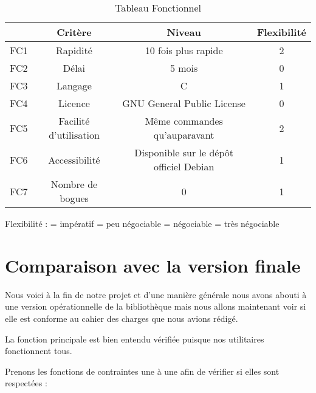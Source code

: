 \begin{table}[h]
\begin{center}
\begin{tabular}{|c|c|c|c|}
\hline
 & Crit\`ere & Niveau & Flexibilit\'e \\
\hline
 FC1 & Rapidit\'e & 10 fois plus rapide & 2 \\
\hline
 FC2 & D\'elai & 5 mois & 0 \\
\hline
 FC3 & Langage & C & 1 \\
\hline
 FC4 & Licence & GNU General Public License & 0 \\
\hline
 FC5 & Facilit\'e d'utilisation & M\^eme commandes qu'auparavant & 2 \\
\hline
 FC6 & Accessibilit\'e & Disponible sur le d\'ep\^ot officiel Debian & 1 \\
\hline
 FC7 & Nombre de bogues & 0 & 1 \\
\hline
\end{tabular}
\caption{Tableau Fonctionnel}
\end{center}
\label{tab:tabfonctionnel}
\end{table}

Flexibilit\'e :  = imp\'eratif = peu n\'egociable = n\'egociable = tr\`es n\'egociable\newline

\section{Comparaison avec la version finale}
Nous voici \`a la fin de notre projet et d'une mani\`ere g\'en\'erale nous avons abouti \`a une version op\'erationnelle de la biblioth\`eque mais nous 
allons maintenant voir si elle est conforme au cahier des charges que nous avions r\'edig\'e.

La fonction principale est bien entendu v\'erifi\'ee puisque nos utilitaires fonctionnent tous.

Prenons les fonctions de contraintes une \`a une afin de v\'erifier si elles sont respect\'ees :

